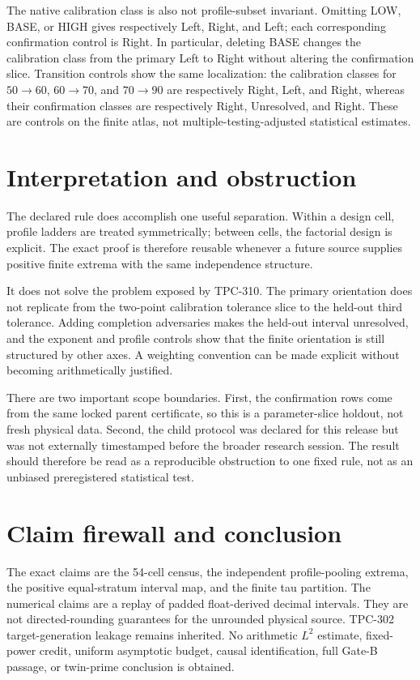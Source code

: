 \documentclass[10pt,a4paper]{article}
\begin{document}
The native calibration class is also not profile-subset invariant.  Omitting
LOW, BASE, or HIGH gives respectively Left, Right, and Left; each corresponding
confirmation control is Right.  In particular, deleting BASE changes the
calibration class from the primary Left to Right without altering the
confirmation slice.  Transition controls show the same localization: the
calibration classes for $50\to60$, $60\to70$, and $70\to90$ are respectively
Right, Left, and Right, whereas their confirmation classes are respectively
Right, Unresolved, and Right.  These are controls on the finite atlas, not
multiple-testing-adjusted statistical estimates.

\section{Interpretation and obstruction}

The declared rule does accomplish one useful separation.  Within a design cell,
profile ladders are treated symmetrically; between cells, the factorial design
is explicit.  The exact proof is therefore reusable whenever a future source
supplies positive finite extrema with the same independence structure.

It does not solve the problem exposed by TPC-310.  The primary orientation
does not replicate from the two-point calibration tolerance slice to the
held-out third tolerance.  Adding completion adversaries makes the held-out
interval unresolved, and the exponent and profile controls show that the
finite orientation is still structured by other axes.  A weighting convention
can be made explicit without becoming arithmetically justified.

There are two important scope boundaries.  First, the confirmation rows come
from the same locked parent certificate, so this is a parameter-slice holdout,
not fresh physical data.  Second, the child protocol was declared for this
release but was not externally timestamped before the broader research
session.  The result should therefore be read as a reproducible obstruction
to one fixed rule, not as an unbiased preregistered statistical test.

\section{Claim firewall and conclusion}

The exact claims are the 54-cell census, the independent profile-pooling
extrema, the positive equal-stratum interval map, and the finite tau partition.
The numerical claims are a replay of padded float-derived decimal intervals.
They are not directed-rounding guarantees for the unrounded physical source.
TPC-302 target-generation leakage remains inherited.  No arithmetic $L^2$
estimate, fixed-power credit, uniform asymptotic budget, causal identification,
full Gate-B passage, or twin-prime conclusion is obtained.
\end{document}

